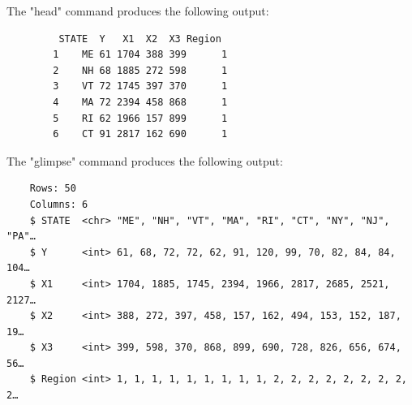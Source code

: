 \documentclass[12pt,letterpaper]{article}
\begin{document}
		\vspace{.5cm}
	
	The "head" command produces the following output:
	
	\begin{verbatim}
		 STATE  Y   X1  X2  X3 Region
		1    ME 61 1704 388 399      1
		2    NH 68 1885 272 598      1
		3    VT 72 1745 397 370      1
		4    MA 72 2394 458 868      1
		5    RI 62 1966 157 899      1
		6    CT 91 2817 162 690      1
	\end{verbatim}
	
	\vspace{.5cm}

	The "glimpse" command produces the following output:
	
\begin{verbatim}
	Rows: 50
	Columns: 6
	$ STATE  <chr> "ME", "NH", "VT", "MA", "RI", "CT", "NY", "NJ", "PA"…
	$ Y      <int> 61, 68, 72, 72, 62, 91, 120, 99, 70, 82, 84, 84, 104…
	$ X1     <int> 1704, 1885, 1745, 2394, 1966, 2817, 2685, 2521, 2127…
	$ X2     <int> 388, 272, 397, 458, 157, 162, 494, 153, 152, 187, 19…
	$ X3     <int> 399, 598, 370, 868, 899, 690, 728, 826, 656, 674, 56…
	$ Region <int> 1, 1, 1, 1, 1, 1, 1, 1, 1, 2, 2, 2, 2, 2, 2, 2, 2, 2…
\end{verbatim}
	
\end{document}
